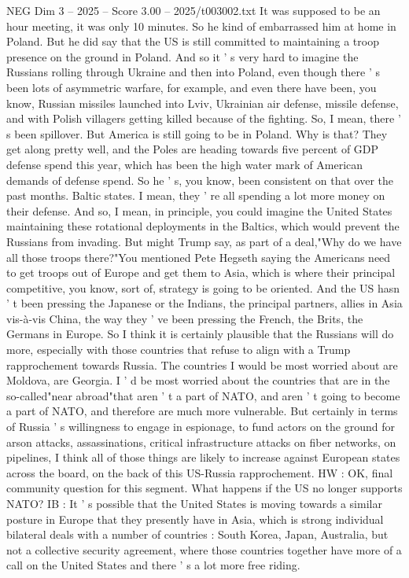 \begin{textsample}{NEG Dim 3 – 2025 – Score 3.00 – 2025/t003002.txt}
It was supposed to be an hour meeting, it was only 10 minutes.
So he kind of embarrassed him at home in Poland.
But he did say that the US is still committed to maintaining a troop presence on the ground in Poland.
And so it ' s very hard to imagine the Russians rolling through Ukraine and then into Poland, even though there ' s been lots of asymmetric warfare, for example, and even there have been, you know, Russian missiles launched into Lviv, Ukrainian air defense, missile defense, and with Polish villagers getting killed because of the fighting.
So, I mean, there ' s been spillover.
But America is still going to be in Poland.
Why is that?
They get along pretty well, and the Poles are heading towards five percent of GDP defense spend this year, which has been the high water mark of American demands of defense spend.
So he ' s, you know, been consistent on that over the past months.
Baltic states.
I mean, they ' re all spending a lot more money on their defense.
And so, I mean, in principle, you could imagine the United States maintaining these rotational deployments in the Baltics, which would prevent the Russians from invading.
But might Trump say, as part of a deal,"Why do we have all those troops there?"You mentioned Pete Hegseth saying the Americans need to get troops out of Europe and get them to Asia, which is where their principal competitive, you know, sort of, strategy is going to be oriented.
And the US hasn ' t been pressing the Japanese or the Indians, the principal partners, allies in Asia vis-à-vis China, the way they ' ve been pressing the French, the Brits, the Germans in Europe.
So I think it is certainly plausible that the Russians will do more, especially with those countries that refuse to align with a Trump rapprochement towards Russia.
The countries I would be most worried about are Moldova, are Georgia.
I ' d be most worried about the countries that are in the so-called"near abroad"that aren ' t a part of NATO, and aren ' t going to become a part of NATO, and therefore are much more vulnerable.
But certainly in terms of Russia ' s willingness to engage in espionage, to fund actors on the ground for arson attacks, assassinations, critical infrastructure attacks on fiber networks, on pipelines, I think all of those things are likely to increase against European states across the board, on the back of this US-Russia rapprochement.
HW : OK, final community question for this segment.
What happens if the US no longer supports NATO?
IB : It ' s possible that the United States is moving towards a similar posture in Europe that they presently have in Asia, which is strong individual bilateral deals with a number of countries : South Korea, Japan, Australia, but not a collective security agreement, where those countries together have more of a call on the United States and there ' s a lot more free riding.

\end{textsample}
